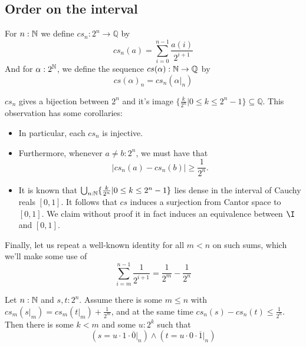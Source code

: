 \subsection{Order on the interval}
\begin{definition}
  For $n:\mathbb{N}$ we define 
  $cs_n:2^n \to \mathbb Q$ by 
  \begin{equation}
    cs_n(a) = \sum\limits_{i=0}^{n-1} \frac{a(i)} {2^{i+1}}
  \end{equation}
  And for $\alpha:2^{\mathbb{N}}$, we define the sequence $cs(\alpha) : \mathbb{N} \to \mathbb Q$ by 
  \begin{equation}
    cs(\alpha)_n = cs_n(\alpha|_n)
  \end{equation}
\end{definition}
\begin{remark}\label{rmkPropertiesCSn}
  $cs_n$ gives a bijection between $2^n$ and it's image 
  $\{\frac{k}{2^n}|0\leq k \leq 2^{n}-1\}\subseteq \mathbb Q$.
  This observation has some corollaries: 
  \begin{itemize}
    \item In particular, each $cs_n$ is injective. 
    \item Furthermore, whenever $a\neq b:2^n$, we must have that 
      \begin{equation} 
        |cs_n(a)-cs_n(b)|\geq \frac{1}{2^n}.
      \end{equation}
    \item It is known that $\bigcup_{n:\mathbb{N}} \{\frac{k}{2^n}|0\leq k \leq 2^{n}-1\}$ 
      lies dense in the interval of Cauchy reals $[0,1]$. 
      It follows that $cs$ induces a surjection from Cantor space to $[0,1]$. %
      We claim without proof it in fact induces an equivalence between $\I$ and $[0,1]$.
  \end{itemize}
  Finally, let us repeat a well-known identity for all $m<n$ on such sums, which we'll make some use of 
  \begin{equation}
   \sum\limits_{i = m}^{n-1} \frac{1}{2^{i+1}} = \frac{1}{2^{m}} - \frac{1}{2^n}
  \end{equation}
\end{remark}
\begin{lemma}\label{CauchyApproxLemma}
  Let $n:\mathbb{N}$ and  $s,t:2^n$. Assume there is some $ m \leq n$ with $cs_m(s|_m) = cs_m(t|_m) + \frac{1}{2^m}$, and 
  at the same time $cs_n(s) -cs_n(t)\leq \frac{1}{2^n}$. 
  Then there is some $k< m$ and some $u:2^k$ such that 
  \begin{equation}
    (s = u \cdot 1 \cdot \overline 0|_n)
    \wedge 
    (t = u \cdot 0 \cdot \overline 1|_n)
  \end{equation}
\end{lemma}
